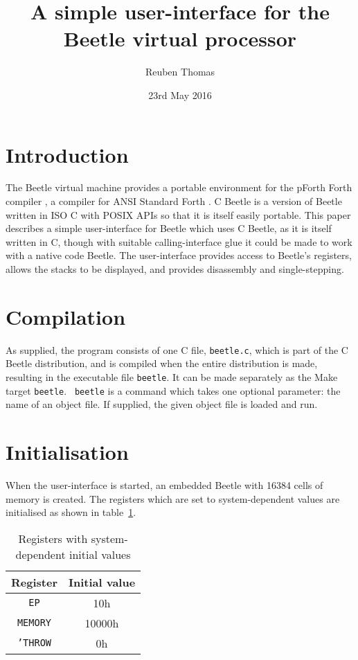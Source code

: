 \documentclass{article}
\title{A simple user-interface for the Beetle virtual processor}
\author{Reuben Thomas}
\date{23rd May 2016}
\begin{document}
\maketitle


\section{Introduction}

The Beetle virtual machine \cite{beetle} provides a portable
environment for the pForth Forth compiler \cite{beetledis}, a compiler
for ANSI Standard Forth \cite{ANSIforth}. C Beetle \cite{cbeetle} is
a version of Beetle written in ISO C with POSIX APIs so that it is
itself easily portable. This paper describes a simple user-interface
for Beetle which uses C Beetle, as it is itself written in C, though
with suitable calling-interface glue it could be made to work with a
native code Beetle. The user-interface provides access to Beetle's
registers, allows the stacks to be displayed, and provides disassembly
and single-stepping.


\section{Compilation}

As supplied, the program consists of one C file, {\tt beetle.c}, which
is part of the C Beetle distribution, and is compiled when the entire
distribution is made, resulting in the executable file {\tt beetle}.
It can be made separately as the Make target {\tt beetle}. {\tt
  beetle} is a command which takes one optional parameter: the name of
an object file. If supplied, the given object file is loaded and run.


\section{Initialisation}
\label{uifaceinit}

When the user-interface is started, an embedded Beetle with 16384 cells of
memory is created. The registers which are set to system-dependent values are
initialised as shown in table~\ref{uinittable}.

\begin{table}[htbp]
\begin{center}
\begin{tabular}{|c|c|} \hline
\rule[-2mm]{0mm}{6mm}\bf Register & \bf Initial value \\ \hline
{\tt EP} & 10h \\
{\tt MEMORY} & 10000h \\
{\tt 'THROW} & 0h \\ \hline
\end{tabular}
\caption{\label{uinittable}Registers with system-dependent initial values}
\end{center}
\end{table}
\end{document}
